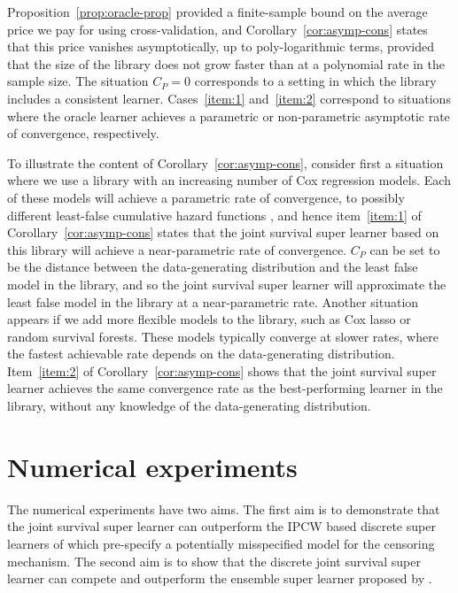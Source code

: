 \documentclass[alpha-refs]{wiley-article}
\newcommand{\1}{\mathds{1}}
\begin{document}
Proposition~\ref{prop:oracle-prop} provided a finite-sample bound
on the average price we pay for using cross-validation, and
Corollary~\ref{cor:asymp-cons} states that this price vanishes
asymptotically, up to poly-logarithmic terms, provided that the size
of the library does not grow faster than at a polynomial rate in the
sample size. The situation \( C_P=0 \) corresponds to a setting in
which the library includes a consistent learner. Cases~\ref{item:1}
and~\ref{item:2} correspond to situations where the oracle learner
achieves a parametric or non-parametric asymptotic rate of
convergence, respectively.

To illustrate the content of Corollary~\ref{cor:asymp-cons}, consider
first a situation where we use a library with an increasing number of
Cox regression models. Each of these models will achieve a parametric
rate of convergence, to possibly different least-false cumulative
hazard functions \cite{hjort1992inference}, and hence
item~\ref{item:1} of Corollary~\ref{cor:asymp-cons} states that the
joint survival super learner based on this library will achieve a
near-parametric rate of convergence.  \( C_P \) can be set to be the
distance between the data-generating distribution and the least false
model in the library, and so the joint survival super learner will
approximate the least false model in the library at a near-parametric
rate. Another situation appears if we add more flexible models to the
library, such as Cox lasso or random survival forests.  These models
typically converge at slower rates, where the fastest achievable rate
depends on the data-generating distribution.  Item~\ref{item:2} of
Corollary~\ref{cor:asymp-cons} shows that the joint survival super
learner achieves the same convergence rate as the best-performing
learner in the library, without any knowledge of the data-generating
distribution.

\section{Numerical experiments}
\label{sec:numer-exper}

The numerical experiments have two aims. The first aim is to
demonstrate that the joint survival super learner can outperform the
IPCW based discrete super learners of \citep{gonzalez2021stacked}
which pre-specify a potentially misspecified model for the censoring
mechanism. The second aim is to show that the discrete joint survival
super learner can compete and outperform the ensemble super learner
proposed by \cite{westling2021inference}.
\end{document}
